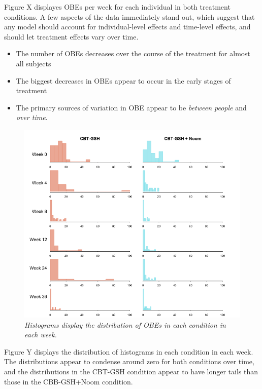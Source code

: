 \documentclass[12pt, oneside]{article}
\begin{document}
Figure X displayes OBEs per week for each individual in both treatment conditions.  A few aspects of the data immediately stand out, which suggest that any model should account for individual-level effects and time-level effects, and should let treatment effects vary over time.  
\begin{itemize}
\item{The number of OBEs decreases over the course of the treatment for almost all subjects}
\item{The biggest decreases in OBEs appear to occur in the early stages of treatment}
\item{The primary sources of variation in OBE appear to be \emph{between people} and \emph{over time}.}
\end{itemize}

\newpage

\begin{figure}
\centering
\includegraphics[width=\textwidth, height=\textheight, keepaspectratio]{noom_hist.png}
\caption{\emph{Histograms display the distribution of OBEs in each condition in each week.}}
\end{figure}

Figure Y displays the distribution of histograms in each condition in each week.  The distributions appear to condense around zero for both conditions over time, and the distributions in the CBT-GSH condition appear to have longer tails than those in the CBB-GSH+Noom condition.  
\end{document}
